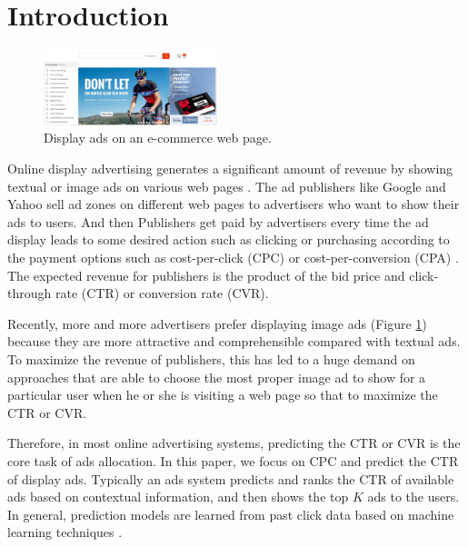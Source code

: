 \documentclass{sig-alternate-05-2015}
\begin{document}

\section{Introduction}
\begin{figure}
	\centering
	\includegraphics[width=0.45\textwidth]{ad}
	\caption{Display ads on an e-commerce web page.}
	\label{fig:ad}
\end{figure}
Online display advertising generates a significant amount of revenue by showing textual or image ads on various web pages \cite{chapelle2014simple}.   The ad publishers like Google and Yahoo sell  ad zones on different web pages to advertisers who want to show their ads to users. And then Publishers get paid by advertisers every time the ad display leads to some desired action  such as clicking or purchasing according to the payment options such as cost-per-click (CPC) or cost-per-conversion (CPA) \cite{mahdian2007pay}. The expected revenue for publishers is the product of the bid price and click-through rate (CTR) or conversion rate (CVR).

Recently, more and more advertisers prefer displaying image ads \cite{mei2011internet} (Figure \ref{fig:ad}) because they are more attractive and comprehensible compared with textual ads.   To maximize the revenue of publishers,  this has led to a huge demand on approaches that are able to choose the most proper image ad to show for a particular user when he or she is visiting a web page so that to maximize the CTR or CVR. 

Therefore, in most online advertising systems, predicting the CTR or CVR is the core task of ads allocation.  In this paper, we focus on CPC and predict the CTR of display ads. Typically an ads system  predicts and ranks the CTR of available ads based on contextual information, and then shows the top $K$ ads to the users. In general, prediction models are learned from past click data based on machine learning techniques \cite{chapelle2014simple,  richardson2007predicting, he2014practical, dave2010learning, zhang2016deep,mcmahan2013ad}.
\end{document}

